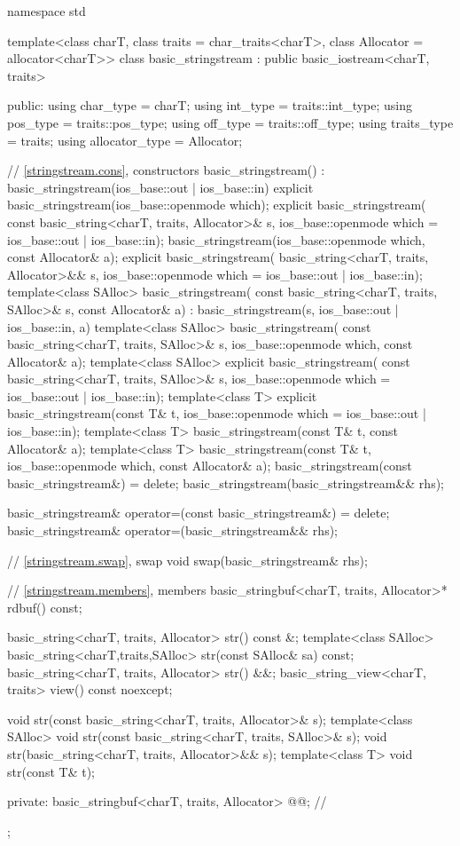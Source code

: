 %
\begin{codeblock}
namespace std {
  template<class charT, class traits = char_traits<charT>, class Allocator = allocator<charT>>
  class basic_stringstream : public basic_iostream<charT, traits> {
  public:
    using char_type      = charT;
    using int_type       = traits::int_type;
    using pos_type       = traits::pos_type;
    using off_type       = traits::off_type;
    using traits_type    = traits;
    using allocator_type = Allocator;

    // \ref{stringstream.cons}, constructors
    basic_stringstream() : basic_stringstream(ios_base::out | ios_base::in) {}
    explicit basic_stringstream(ios_base::openmode which);
    explicit basic_stringstream(
      const basic_string<charT, traits, Allocator>& s,
      ios_base::openmode which = ios_base::out | ios_base::in);
    basic_stringstream(ios_base::openmode which, const Allocator& a);
    explicit basic_stringstream(
      basic_string<charT, traits, Allocator>&& s,
      ios_base::openmode which = ios_base::out | ios_base::in);
    template<class SAlloc>
      basic_stringstream(
        const basic_string<charT, traits, SAlloc>& s, const Allocator& a)
        : basic_stringstream(s, ios_base::out | ios_base::in, a) {}
    template<class SAlloc>
      basic_stringstream(
        const basic_string<charT, traits, SAlloc>& s,
        ios_base::openmode which, const Allocator& a);
    template<class SAlloc>
      explicit basic_stringstream(
        const basic_string<charT, traits, SAlloc>& s,
        ios_base::openmode which = ios_base::out | ios_base::in);
    template<class T>
      explicit basic_stringstream(const T& t,
                                  ios_base::openmode which = ios_base::out | ios_base::in);
    template<class T>
      basic_stringstream(const T& t, const Allocator& a);
    template<class T>
      basic_stringstream(const T& t, ios_base::openmode which, const Allocator& a);
    basic_stringstream(const basic_stringstream&) = delete;
    basic_stringstream(basic_stringstream&& rhs);

    basic_stringstream& operator=(const basic_stringstream&) = delete;
    basic_stringstream& operator=(basic_stringstream&& rhs);

    // \ref{stringstream.swap}, swap
    void swap(basic_stringstream& rhs);

    // \ref{stringstream.members}, members
    basic_stringbuf<charT, traits, Allocator>* rdbuf() const;

    basic_string<charT, traits, Allocator> str() const &;
    template<class SAlloc>
      basic_string<charT,traits,SAlloc> str(const SAlloc& sa) const;
    basic_string<charT, traits, Allocator> str() &&;
    basic_string_view<charT, traits> view() const noexcept;

    void str(const basic_string<charT, traits, Allocator>& s);
    template<class SAlloc>
      void str(const basic_string<charT, traits, SAlloc>& s);
    void str(basic_string<charT, traits, Allocator>&& s);
    template<class T>
      void str(const T& t);

  private:
    basic_stringbuf<charT, traits, Allocator> @@;   // \expos
  };
}
\end{codeblock}

